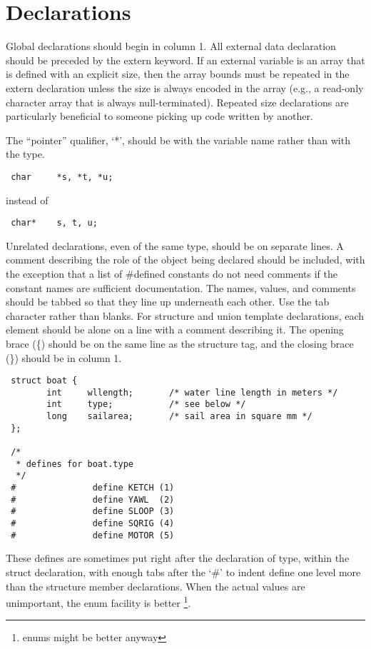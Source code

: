 \section{Declarations}

 Global declarations should begin in column 1. All external data declaration
should be preceded by the extern keyword. If an external variable is an array
that is defined with an explicit size, then the array bounds must be repeated
in the extern declaration unless the size is always encoded in the array (e.g.,
a read-only character array that is always null-terminated). Repeated size
declarations are particularly beneficial to someone picking up code written by
another. 

 The ``pointer'' qualifier, `*', should be with the variable name rather than
with the type. 
\begin{verbatim}
 char     *s, *t, *u; 
\end{verbatim}
instead of 
\begin{verbatim}
 char*    s, t, u; 
\end{verbatim}

 Unrelated declarations, even of the same type, should be on separate lines. A
comment describing the role of the object being declared should be included,
with the exception that a list of \#defined constants do not need comments if
the constant names are sufficient documentation. The names, values, and
comments should be tabbed so that they line up underneath each other. Use the
tab character rather than blanks. For structure and union template
declarations, each element should be alone on a line with a comment describing
it. The opening brace (\{) should be on the same line as the structure tag,
and the closing brace (\}) should be in column 1. 

\begin{verbatim}
 struct boat {
        int     wllength;       /* water line length in meters */
        int     type;           /* see below */
        long    sailarea;       /* sail area in square mm */
 }; 

 /*
  * defines for boat.type
  */
 #               define KETCH (1)
 #               define YAWL  (2)
 #               define SLOOP (3)
 #               define SQRIG (4)
 #               define MOTOR (5) 
\end{verbatim}

These defines are sometimes put right after the declaration of type, within the
struct declaration, with enough tabs after the `\#' to indent define one level
more than the structure member declarations. When the actual values are
unimportant, the enum facility is better \footnote{enums might be better
anyway}.

